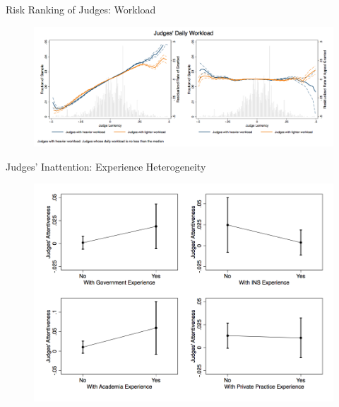 \begin{frame}{Risk Ranking of Judges: Workload}
    \begin{figure}
        \centering
        \includegraphics[height = 0.6 \textheight]{images/comp_judge_morecase_perday.png}
    \end{figure}
\end{frame}

\begin{frame}{Judges' Inattention: Experience Heterogeneity}
    \begin{figure}
        \centering
        \includegraphics[height = 0.6 \textheight]{images/judge_expdum_full.png}
    \end{figure}
\end{frame}

